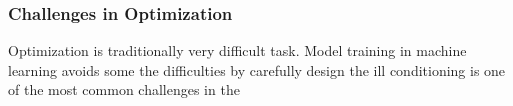 \subsubsection{Challenges in Optimization}

Optimization is traditionally very difficult task. Model training in machine learning avoids some the difficulties by carefully design 
the ill conditioning is one of the most common challenges in the 